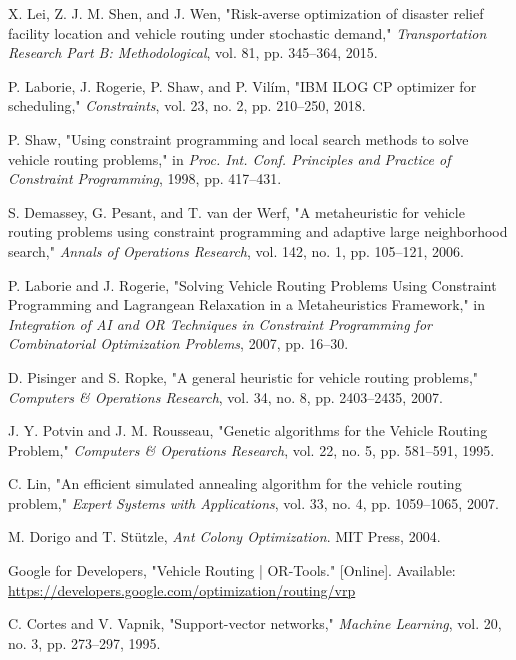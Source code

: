 \documentclass[conference]{IEEEtran} %
\begin{document}
\begin{thebibliography}{99}
X. Lei, Z. J. M. Shen, and J. Wen, "Risk-averse optimization of disaster relief facility location and vehicle routing under stochastic demand," \textit{Transportation Research Part B: Methodological}, vol. 81, pp. 345--364, 2015.

P. Laborie, J. Rogerie, P. Shaw, and P. Vilím, "IBM ILOG CP optimizer for scheduling," \textit{Constraints}, vol. 23, no. 2, pp. 210--250, 2018.

P. Shaw, "Using constraint programming and local search methods to solve vehicle routing problems," in \textit{Proc. Int. Conf. Principles and Practice of Constraint Programming}, 1998, pp. 417--431.

S. Demassey, G. Pesant, and T. van der Werf, "A metaheuristic for vehicle routing problems using constraint programming and adaptive large neighborhood search," \textit{Annals of Operations Research}, vol. 142, no. 1, pp. 105--121, 2006.

P. Laborie and J. Rogerie, "Solving Vehicle Routing Problems Using Constraint Programming and Lagrangean Relaxation in a Metaheuristics Framework," in \textit{Integration of AI and OR Techniques in Constraint Programming for Combinatorial Optimization Problems}, 2007, pp. 16--30.

D. Pisinger and S. Ropke, "A general heuristic for vehicle routing problems," \textit{Computers \& Operations Research}, vol. 34, no. 8, pp. 2403--2435, 2007.

J. Y. Potvin and J. M. Rousseau, "Genetic algorithms for the Vehicle Routing Problem," \textit{Computers & Operations Research}, vol. 22, no. 5, pp. 581--591, 1995.

C. Lin, "An efficient simulated annealing algorithm for the vehicle routing problem," \textit{Expert Systems with Applications}, vol. 33, no. 4, pp. 1059--1065, 2007.

M. Dorigo and T. Stützle, \textit{Ant Colony Optimization}. MIT Press, 2004.

Google for Developers, "Vehicle Routing | OR-Tools." [Online]. Available: \url{https://developers.google.com/optimization/routing/vrp}

C. Cortes and V. Vapnik, "Support-vector networks," \textit{Machine Learning}, vol. 20, no. 3, pp. 273--297, 1995.


\end{thebibliography}
\end{document}
